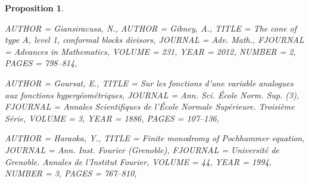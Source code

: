 \documentclass[11pt]{amsart}
\newtheorem{proposition}[theorem]{Proposition}
\numberwithin{theorem}{subsection}
\begin{document}
{\begin{proposition}
\begin{bibdiv}
\begin{biblist}
 {
    AUTHOR = {Giansiracusa, N.},
    AUTHOR = {Gibney, A.},
     TITLE = {The cone of type {$A$}, level 1, conformal blocks divisors},
   JOURNAL = {Adv. Math.},
  FJOURNAL = {Advances in Mathematics},
    VOLUME = {231},
      YEAR = {2012},
    NUMBER = {2},
     PAGES = {798--814},
}




 {
    AUTHOR = {Goursat, E.},
     TITLE = {Sur les fonctions d'une variable analogues aux fonctions
              hyperg\'{e}om\'{e}triques},
   JOURNAL = {Ann. Sci. \'{E}cole Norm. Sup. (3)},
  FJOURNAL = {Annales Scientifiques de l'\'{E}cole Normale Sup\'{e}rieure. Troisi\`eme
              S\'{e}rie},
    VOLUME = {3},
      YEAR = {1886},
     PAGES = {107--136},
}

		



 {
    AUTHOR = {Haraoka, Y.},
     TITLE = {Finite monodromy of {P}ochhammer equation},
   JOURNAL = {Ann. Inst. Fourier (Grenoble)},
  FJOURNAL = {Universit\'{e} de Grenoble. Annales de l'Institut Fourier},
    VOLUME = {44},
      YEAR = {1994},
    NUMBER = {3},
     PAGES = {767--810},
}

\end{biblist}
\end{bibdiv}
\end{proposition}}
\end{document}
